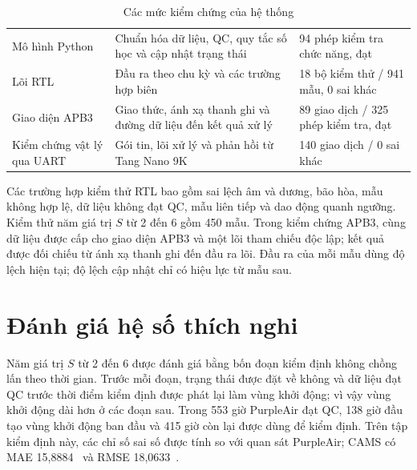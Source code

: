 \documentclass[a4paper,oneside,openany]{extreport}
\begin{document}
\begin{table}[H]
\centering
\caption{Các mức kiểm chứng của hệ thống}
\label{tab:verification_levels}
\begin{tabularx}{\textwidth}{|L{0.23\textwidth}|Y|Y|}
\hline
{} &  &  \\
\hline
Mô hình Python & Chuẩn hóa dữ liệu, QC, quy tắc số học và cập nhật trạng thái & 94 phép kiểm tra chức năng, đạt \\
\hline
Lõi RTL & Đầu ra theo chu kỳ và các trường hợp biên & 18 bộ kiểm thử / 941 mẫu, 0 sai khác \\
\hline
Giao diện APB3 & Giao thức, ánh xạ thanh ghi và đường dữ liệu đến kết quả xử lý & 89 giao dịch / 325 phép kiểm tra, đạt \\
\hline
Kiểm chứng vật lý qua UART & Gói tin, lõi xử lý và phản hồi từ Tang Nano 9K & 140 giao dịch / 0 sai khác \\
\hline
\end{tabularx}
\end{table}

Các trường hợp kiểm thử RTL bao gồm sai lệch âm và dương, bão hòa, mẫu không hợp lệ, dữ liệu không đạt QC, mẫu liên tiếp và dao động quanh ngưỡng. Kiểm thử năm giá trị $S$ từ 2 đến 6 gồm 450 mẫu. Trong kiểm chứng APB3, cùng dữ liệu được cấp cho giao diện APB3 và một lõi tham chiếu độc lập; kết quả được đối chiếu từ ánh xạ thanh ghi đến đầu ra lõi. Đầu ra của mỗi mẫu dùng độ lệch hiện tại; độ lệch cập nhật chỉ có hiệu lực từ mẫu sau.

\section{Đánh giá hệ số thích nghi}
Năm giá trị $S$ từ 2 đến 6 được đánh giá bằng bốn đoạn kiểm định không chồng lấn theo thời gian. Trước mỗi đoạn, trạng thái được đặt về không và dữ liệu đạt QC trước thời điểm kiểm định được phát lại làm vùng khởi động; vì vậy vùng khởi động dài hơn ở các đoạn sau. Trong 553 giờ PurpleAir đạt QC, 138 giờ đầu tạo vùng khởi động ban đầu và 415 giờ còn lại được dùng để kiểm định. Trên tập kiểm định này, các chỉ số sai số được tính so với quan sát PurpleAir; CAMS có MAE 15,8884~\pmunit{} và RMSE 18,0633~\pmunit{}.
\end{document}
